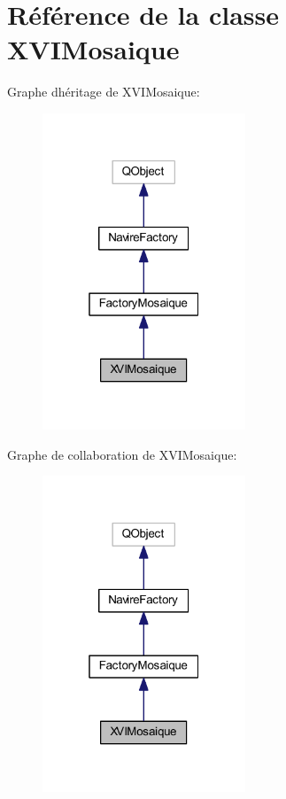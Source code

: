 \hypertarget{class_x_v_i_mosaique}{}\section{Référence de la classe X\+V\+I\+Mosaique}
\label{class_x_v_i_mosaique}


Graphe d\textquotesingle{}héritage de X\+V\+I\+Mosaique\+:
\nopagebreak
\begin{figure}[H]
\begin{center}
\leavevmode
\includegraphics[width=172pt]{class_x_v_i_mosaique__inherit__graph}
\end{center}
\end{figure}


Graphe de collaboration de X\+V\+I\+Mosaique\+:
\nopagebreak
\begin{figure}[H]
\begin{center}
\leavevmode
\includegraphics[width=172pt]{class_x_v_i_mosaique__coll__graph}
\end{center}
\end{figure}
